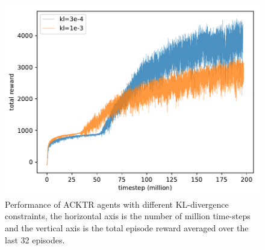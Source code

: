 \begin{figure}[!htbp]
	\includegraphics[width=\textwidth]{images/rec_180612_mix.pdf}
	\centering
	\caption{Performance of ACKTR agents with different KL-divergence constraints, the horizontal axis is the number of million time-steps and the vertical axis is the total episode reward averaged over the last 32 episodes.}\label{rec_mix}
\end{figure}

